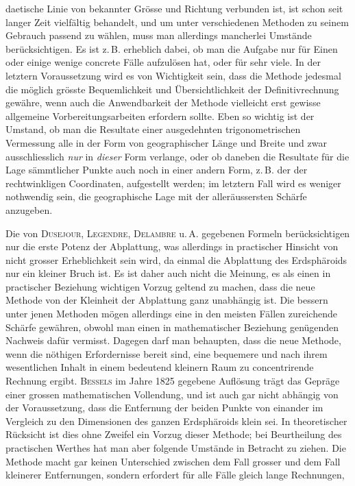 %
daetische Linie von bekannter Grösse und Richtung verbunden ist, ist schon seit langer Zeit vielfältig behandelt, und um unter verschiedenen Methoden zu seinem Gebrauch passend zu wählen, muss man allerdings mancherlei Umstände berücksichtigen. Es ist z.\,B. erheblich dabei, ob man die Aufgabe nur für Einen oder einige wenige concrete Fälle aufzulösen hat, oder für sehr viele. In der letztern Voraussetzung wird es von Wichtigkeit sein, dass die Methode jedesmal die möglich grösste Bequemlichkeit und Übersichtlichkeit der Definitivrechnung gewähre, wenn auch die Anwendbarkeit der Methode vielleicht erst gewisse allgemeine Vorbereitungsarbeiten erfordern sollte. Eben so wichtig ist der Umstand, ob man die Resultate einer ausgedehnten trigonometrischen Vermessung alle in der Form von geographischer Länge und Breite und zwar ausschliesslich \textit{nur} in \textit{dieser} Form verlange, oder ob daneben die Resultate für die Lage sämmtlicher Punkte auch noch in einer andern Form, z.\,B. der der rechtwinkligen Coordinaten, aufgestellt werden; im letztern Fall wird es weniger nothwendig sein, die geographische Lage mit der alleräussersten Schärfe anzugeben.

Die von \textsc{Dusejour}, \textsc{Legendre}, \textsc{Delambre} u.\,A. gegebenen Formeln berücksichtigen nur die erste Potenz der Abplattung, was allerdings in practischer Hinsicht von nicht grosser Erheblichkeit sein wird, da einmal die Abplattung des Erdsphäroids nur ein kleiner Bruch ist. Es ist daher auch nicht die Meinung, es als einen in practischer Beziehung wichtigen Vorzug geltend zu machen, dass die neue Methode von der Kleinheit der Abplattung ganz unabhängig ist. Die bessern unter jenen Methoden mögen allerdings eine in den meisten Fällen zureichende Schärfe gewähren, obwohl man einen in mathematischer Beziehung genügenden Nachweis dafür vermisst. Dagegen darf man behaupten, dass die neue Methode, wenn die nöthigen Erfordernisse bereit sind, eine bequemere und nach ihrem wesentlichen Inhalt in einem bedeutend kleinern Raum zu concentrirende Rechnung ergibt. \textsc{Bessels} im Jahre 1825 gegebene Auflösung trägt das Gepräge einer grossen mathematischen Vollendung, und ist auch gar nicht abhängig von der Voraussetzung, dass die Entfernung der beiden Punkte von einander im Vergleich zu den Dimensionen des ganzen Erdsphäroids klein sei. In theoretischer Rücksicht ist dies ohne Zweifel ein Vorzug dieser Methode; bei Beurtheilung des practischen Werthes hat man aber folgende Umstände in Betracht zu ziehen. Die Methode macht gar keinen Unterschied zwischen dem Fall grosser und dem Fall kleinerer Entfernungen, sondern erfordert für alle Fälle gleich lange Rechnungen,
